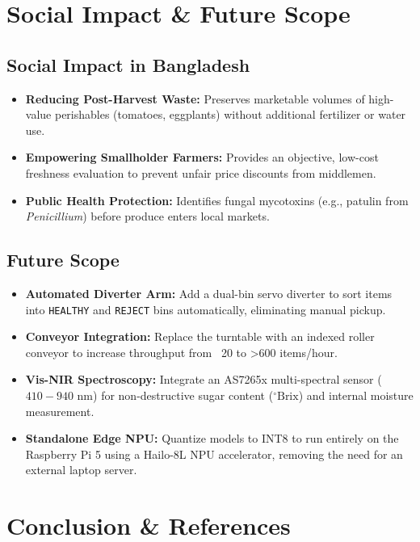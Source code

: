 \documentclass[11pt,a4paper]{article}
\begin{document}
\section{Social Impact \& Future Scope}

\subsection{Social Impact in Bangladesh}
\begin{itemize}[leftmargin=*]
    \item \textbf{Reducing Post-Harvest Waste:} Preserves marketable volumes of high-value perishables (tomatoes, eggplants) without additional fertilizer or water use.
    \item \textbf{Empowering Smallholder Farmers:} Provides an objective, low-cost freshness evaluation to prevent unfair price discounts from middlemen.
    \item \textbf{Public Health Protection:} Identifies fungal mycotoxins (e.g., patulin from \textit{Penicillium}) before produce enters local markets.
\end{itemize}

\subsection{Future Scope}
\begin{itemize}[leftmargin=*]
    \item \textbf{Automated Diverter Arm:} Add a dual-bin servo diverter to sort items into \texttt{HEALTHY} and \texttt{REJECT} bins automatically, eliminating manual pickup.
    \item \textbf{Conveyor Integration:} Replace the turntable with an indexed roller conveyor to increase throughput from ~20 to >600 items/hour.
    \item \textbf{Vis-NIR Spectroscopy:} Integrate an AS7265x multi-spectral sensor ($410 - 940$ nm) for non-destructive sugar content ($^\circ\text{Brix}$) and internal moisture measurement.
    \item \textbf{Standalone Edge NPU:} Quantize models to INT8 to run entirely on the Raspberry Pi 5 using a Hailo-8L NPU accelerator, removing the need for an external laptop server.
\end{itemize}

\section{Conclusion \& References}
\end{document}
